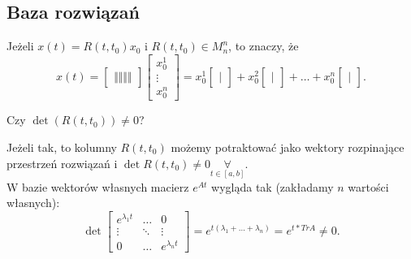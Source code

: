 \documentclass[../main.tex]{subfiles}
\begin{document}
\subsection{Baza rozwiązań}
\begin{obserwacja}
    Jeżeli $x(t) = R(t,t_0)x_0$ i $R(t,t_0)\in M_n^n$, to znaczy, że
    \[
        x(t) = \begin{bmatrix} \Vert  \Vert \Vert  \Vert  \end{bmatrix} \begin{bmatrix} x_0^1\\ \vdots\\ x_0^n \end{bmatrix} = x_0^1 \begin{bmatrix} | \end{bmatrix} + x_0^2 \begin{bmatrix} | \end{bmatrix} + \ldots + x_0^n \begin{bmatrix} | \end{bmatrix}
    .\]
\end{obserwacja}
\begin{pytanie}
    Czy $\det (R(t,t_0)) \neq 0$?
\end{pytanie}
Jeżeli tak, to kolumny $R(t,t_0)$ możemy potraktować jako wektory rozpinające przestrzeń rozwiązań i $\det R(t,t_0)\neq 0 \underset{t\in[a,b]}{\forall} $.\\
W bazie wektorów własnych macierz $e^{At}$ wygląda tak (zakładamy $n$ wartości własnych):
\[
    \det \begin{bmatrix} e^{\lambda_1 t}&\ldots&0\\ \vdots&\ddots&\vdots \\ 0 &\ldots&e^{\lambda_n t} \end{bmatrix} = e^{t(\lambda_1+\ldots+\lambda_n)} = e^{t* Tr A} \neq 0
.\]
\end{document}
